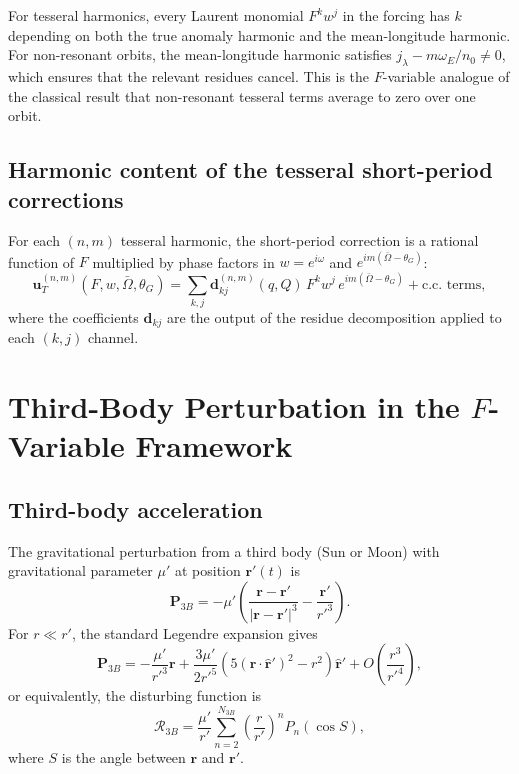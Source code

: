 \documentclass[11pt]{article}
\begin{document}
For tesseral harmonics, every Laurent monomial $F^k w^j$ in the forcing
has $k$ depending on both the true anomaly harmonic and the mean-longitude
harmonic. For non-resonant orbits, the mean-longitude harmonic satisfies
$j_\lambda - m\omega_E/n_0 \ne 0$, which ensures that the relevant
residues cancel. This is the $F$-variable analogue of the classical result
that non-resonant tesseral terms average to zero over one orbit.

\subsection{Harmonic content of the tesseral short-period corrections}

For each $(n,m)$ tesseral harmonic, the short-period correction is a
rational function of $F$ multiplied by phase factors in
$w = e^{i\omega}$ and
$e^{im(\bar\Omega - \theta_G)}$:
\begin{equation}
\bm u_T^{(n,m)}(F, w, \bar\Omega, \theta_G)
= \sum_{k,j} \bm d_{kj}^{(n,m)}(q, Q)\,
F^k w^j\,
e^{im(\bar\Omega - \theta_G)}
+ \text{c.c.\ terms},
\end{equation}
where the coefficients $\bm d_{kj}$ are the output of the residue
decomposition applied to each $(k, j)$ channel.


\section{Third-Body Perturbation in the \texorpdfstring{$F$}{F}-Variable
Framework}
\label{sec:thirdbody}

\subsection{Third-body acceleration}

The gravitational perturbation from a third body (Sun or Moon) with
gravitational parameter $\mu'$ at position $\bm r'(t)$ is
\begin{equation}
\bm P_{3B}
= -\mu'\left(
\frac{\bm r - \bm r'}{|\bm r - \bm r'|^3}
- \frac{\bm r'}{r'^3}
\right).
\label{eq:thirdbody_accel}
\end{equation}
For $r \ll r'$, the standard Legendre expansion gives
\begin{equation}
\bm P_{3B}
= -\frac{\mu'}{r'^3}\bm r
+ \frac{3\mu'}{2r'^5}\left(5(\bm r \cdot \hat{\bm r}')^2 - r^2\right)
\hat{\bm r}'
+ O\left(\frac{r^3}{r'^4}\right),
\end{equation}
or equivalently, the disturbing function is
\begin{equation}
\mathcal R_{3B}
= \frac{\mu'}{r'}\sum_{n=2}^{N_{3B}}
\left(\frac{r}{r'}\right)^n P_n(\cos S),
\label{eq:R3B_legendre}
\end{equation}
where $S$ is the angle between $\bm r$ and $\bm r'$.
\end{document}

